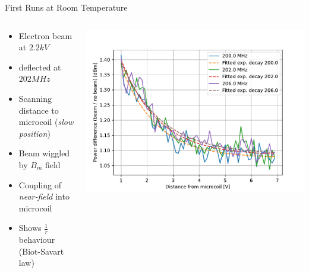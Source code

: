 \documentclass[final]{beamer}
\begin{document}
\begin{frame}[fragile]{}
\begin{columns}[T]
\begin{column}{.49\linewidth}
      \begin{block}{\Large First Runs at Room Temperature}
        \begin{columns}
          \begin{column}{0.4\columnwidth}
            \begin{itemize}
                \item Electron beam at $2.2 kV$
                \item deflected at $202 MHz$
                \item Scanning distance to microcoil (\textit{slow position})
                \item Beam wiggled by $B_m$ field
                \item Coupling of \textit{near-field} into microcoil
                \item Shows $\frac{1}{r}$ behaviour (Biot-Savart law)
            \end{itemize}
          \end{column}
          \begin{column}{0.6\columnwidth}
            \includegraphics[width=\columnwidth]{figures/beamcoupling.pdf}
          \end{column}
        \end{columns}
      \end{block}


\end{column}
\end{columns}
\end{frame}
\end{document}
